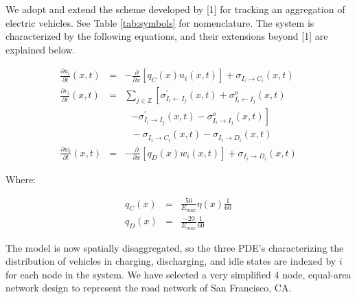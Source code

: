 \documentclass[journal]{IEEEtran}
\begin{document}
We adopt and extend the scheme developed by [1] for tracking an aggregation of electric vehicles. See Table \ref{tab:symbols} for nomenclature. The system is characterized by the following equations, and their extensions beyond [1] are explained below. 

\begin{eqnarray*}
    \frac{\partial u_i}{\partial t}(x,t) &=& -\frac{\partial}{\partial x}\left[ q_C(x) u_i(x,t) \right] + \sigma_{I_i \rightarrow C_i}(x,t) \\
    \frac{\partial v_i}{\partial t}(x,t) &=& \sum_{j\in\mathbb{Z}} \left[ \sigma_{I_i \leftarrow I_j}^\prime(x,t) + \sigma_{I_i \leftarrow I_j}^o(x,t) \right. \\
    & & ~~~ \left. - \sigma_{I_i \rightarrow I_j}^\prime(x,t) - \sigma_{I_i \rightarrow I_j}^o(x,t) \right] \\
    && ~~~ - \sigma_{I_i \rightarrow C_i}(x,t) - \sigma_{I_i \rightarrow D_i}(x,t) \\
    \frac{\partial w_i}{\partial t}(x,t) &=& -\frac{\partial}{\partial x}\left[ q_D(x) w_i(x,t) \right] + \sigma_{I_i \rightarrow D_i}(x,t) 
\end{eqnarray*}

Where: 

\begin{eqnarray*}
q_C(x) &=& \frac{50}{E_{max}}\eta(x)\frac{1}{60} \\
q_D(x) &=& \frac{-20}{E_{max}}\frac{1}{60}
\end{eqnarray*}

The model is now spatially disaggregated, so the three PDE's characterizing the distribution of vehicles in charging, discharging, and idle states are indexed by $i$ for each node in the system. We have selected a very simplified 4 node, equal-area network design to represent the road network of San Francisco, CA. %
\end{document}
